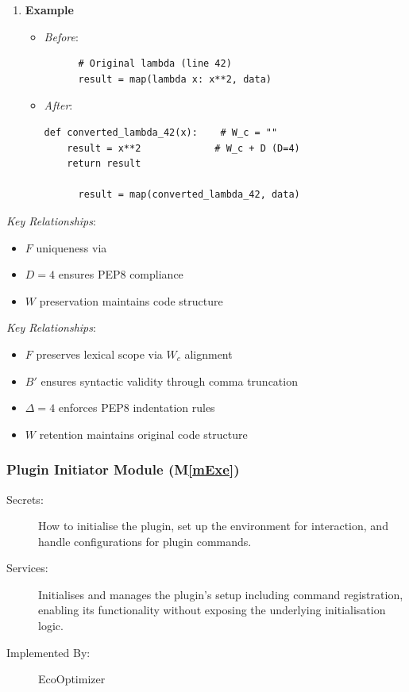 \documentclass[12pt, titlepage]{article}
\newcommand{\mref}[1]{M\ref{#1}}
\begin{document}
\begin{enumerate}
  \item \textbf{Example}
  \begin{itemize}
      \item \textit{Before}:
      \begin{verbatim}
      # Original lambda (line 42)
      result = map(lambda x: x**2, data)
      \end{verbatim}
      
      \item \textit{After}:
      \begin{verbatim}
def converted_lambda_42(x):    # W_c = ""
    result = x**2             # W_c + D (D=4)
    return result

      result = map(converted_lambda_42, data)
      \end{verbatim}
  \end{itemize}
\end{enumerate}

\textit{Key Relationships}:
\begin{itemize}
    \item \( F \) uniqueness via 
    \item \( D = 4 \) ensures PEP8 compliance
    \item \( W \) preservation maintains code structure
\end{itemize}

\textit{Key Relationships}:
\begin{itemize}
    \item \( F \) preserves lexical scope via \( W_c \) alignment
    \item \( B' \) ensures syntactic validity through comma truncation
    \item \( \Delta = 4 \) enforces PEP8 indentation rules
    \item \( W \) retention maintains original code structure
\end{itemize}

\subsubsection{Plugin Initiator Module (\mref{mExe})}


\begin{description}
    \item[Secrets:] How to initialise the plugin, set up the environment for interaction, and handle configurations for plugin commands.
    \item[Services:] Initialises and manages the plugin's setup including command registration, enabling its functionality without exposing the underlying initialisation logic.
    \item[Implemented By:] EcoOptimizer
\end{description}
\end{document}
